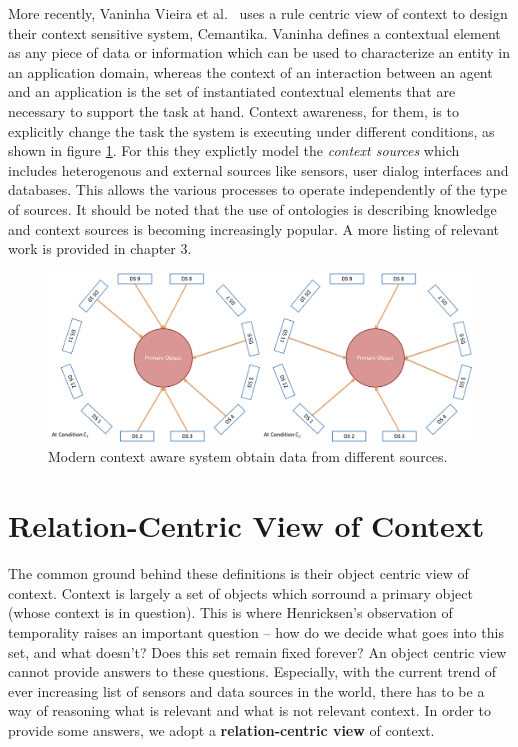 More recently, Vaninha Vieira et al.\ \cite{vieira2011designing} uses a rule centric view of context to design their context sensitive system, Cemantika. Vaninha defines a contextual element as any piece of data or information which can be used to characterize an entity in an application domain, whereas the context of an interaction between an agent and an application is the set of instantiated contextual elements that are necessary to support the task at hand. Context awareness, for them, is to explicitly change the task the system is executing under different conditions, as shown in figure \ref{fig:va-def}. For this they explictly model the \textit{context sources} which includes heterogenous and  external sources like sensors, user dialog interfaces and databases. This allows the various processes to operate independently of the type of sources. It should be noted that the use of ontologies is describing knowledge and context sources is becoming increasingly popular. A more listing of relevant work is provided in chapter 3.

\begin{figure}[t]
\centering
\includegraphics[width=\textwidth]{media/chapter2/va.png}
\caption{Modern context aware system obtain data from different sources.}
\label{fig:va-def}
\end{figure}

\section{Relation-Centric View of Context}

The common ground behind these definitions is their object centric view of context. Context is largely a set of objects which sorround a primary object (whose context is in question). This is where Henricksen's observation of temporality raises an important question -- how do we decide what goes into this set, and what doesn't? Does this set remain fixed forever? An object centric view cannot provide answers to these questions. Especially, with the current trend of ever increasing list of sensors and data sources in the world, there has to be a way of reasoning what is relevant and what is not relevant context. In order to provide some answers, we adopt a \textbf{relation-centric view} of context.

